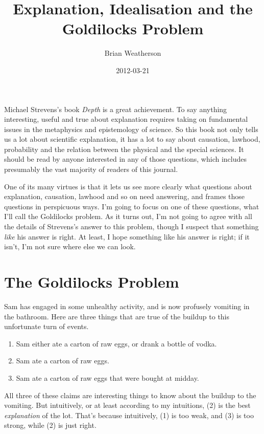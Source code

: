 \documentclass[
  11pt,
  letterpaper,
  DIV=11,
  numbers=noendperiod,
  oneside]{scrartcl}
\title{Explanation, Idealisation and the Goldilocks Problem}
\author{Brian Weatherson}
\date{2012-03-21}
\providecommand{\tightlist}{%
  \setlength{\itemsep}{0pt}\setlength{\parskip}{0pt}}\usepackage{longtable,booktabs,array}
\begin{document}
\maketitle
Michael Strevens's book \emph{Depth} is a great achievement. To say anything interesting,
useful and true about explanation requires taking on fundamental issues
in the metaphysics and epistemology of science. So this book not only
tells us a lot about scientific explanation, it has a lot to say about
causation, lawhood, probability and the relation between the physical
and the special sciences. It should be read by anyone interested in any
of those questions, which includes presumably the vast majority of
readers of this journal.

One of its many virtues is that it lets us see more clearly what
questions about explanation, causation, lawhood and so on need
answering, and frames those questions in perspicuous ways. I'm going to
focus on one of these questions, what I'll call the Goldilocks problem.
As it turns out, I'm not going to agree with all the details of
Strevens's answer to this problem, though I suspect that something
\emph{like} his answer is right. At least, I hope something like his
answer is right; if it isn't, I'm not sure where else we can look.

\section{The Goldilocks Problem}\label{the-goldilocks-problem}

Sam has engaged in some unhealthy activity, and is now profusely
vomiting in the bathroom. Here are three things that are true of the
buildup to this unfortunate turn of events.

\begin{enumerate}
\def\labelenumi{\arabic{enumi}.}
\tightlist
\item
  Sam either ate a carton of raw eggs, or drank a bottle of vodka.
\item
  Sam ate a carton of raw eggs.
\item
  Sam ate a carton of raw eggs that were bought at midday.
\end{enumerate}

All three of these claims are interesting things to know about the
buildup to the vomiting. But intuitively, or at least according to my
intuitions, (2) is the best \emph{explanation} of the lot. That's
because intuitively, (1) is too weak, and (3) is too strong, while (2)
is just right.
\end{document}
